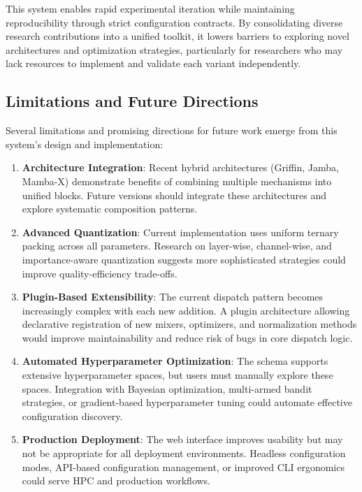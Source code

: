 \documentclass[11pt,a4paper]{article}
\begin{document}
This system enables rapid experimental iteration while maintaining reproducibility through strict configuration contracts. By consolidating diverse research contributions into a unified toolkit, it lowers barriers to exploring novel architectures and optimization strategies, particularly for researchers who may lack resources to implement and validate each variant independently.

\subsection{Limitations and Future Directions}

Several limitations and promising directions for future work emerge from this system's design and implementation:

\begin{enumerate}[leftmargin=*]
    \item \textbf{Architecture Integration}: Recent hybrid architectures (Griffin, Jamba, Mamba-X) demonstrate benefits of combining multiple mechanisms into unified blocks. Future versions should integrate these architectures and explore systematic composition patterns.
    
    \item \textbf{Advanced Quantization}: Current implementation uses uniform ternary packing across all parameters. Research on layer-wise, channel-wise, and importance-aware quantization suggests more sophisticated strategies could improve quality-efficiency trade-offs.
    
    \item \textbf{Plugin-Based Extensibility}: The current dispatch pattern becomes increasingly complex with each new addition. A plugin architecture allowing declarative registration of new mixers, optimizers, and normalization methods would improve maintainability and reduce risk of bugs in core dispatch logic.
    
    \item \textbf{Automated Hyperparameter Optimization}: The schema supports extensive hyperparameter spaces, but users must manually explore these spaces. Integration with Bayesian optimization, multi-armed bandit strategies, or gradient-based hyperparameter tuning could automate effective configuration discovery.
    
    \item \textbf{Production Deployment}: The web interface improves usability but may not be appropriate for all deployment environments. Headless configuration modes, API-based configuration management, or improved CLI ergonomics could serve HPC and production workflows.
    

\end{enumerate}
\end{document}
